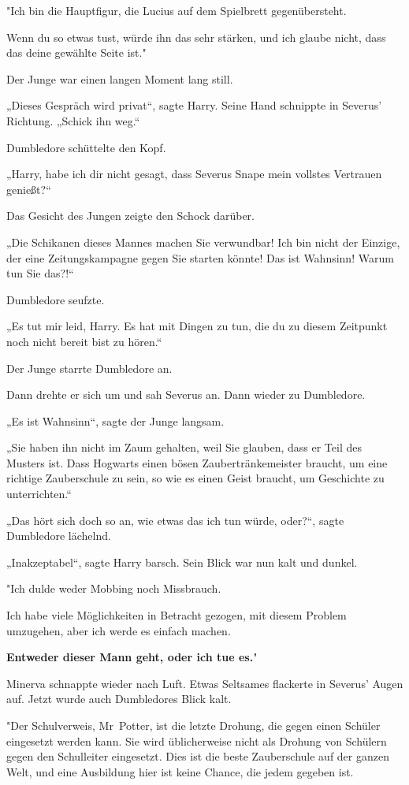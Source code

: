 {"Ich bin die Hauptfigur, die Lucius auf dem Spielbrett gegenübersteht.

Wenn du so etwas tust, würde ihn das sehr stärken, und ich glaube nicht, dass das deine gewählte Seite ist."

Der Junge war einen langen Moment lang still.

„Dieses Gespräch wird privat“, sagte Harry. Seine Hand schnippte in Severus' Richtung. „Schick ihn weg.“

Dumbledore schüttelte den Kopf.

„Harry, habe ich dir nicht gesagt, dass Severus Snape mein vollstes Vertrauen genießt?“

Das Gesicht des Jungen zeigte den Schock darüber.

„Die Schikanen dieses Mannes machen Sie verwundbar! Ich bin nicht der Einzige, der eine Zeitungskampagne gegen Sie starten könnte! Das ist Wahnsinn! Warum tun Sie das?!“

Dumbledore seufzte.

„Es tut mir leid, Harry. Es hat mit Dingen zu tun, die du zu diesem Zeitpunkt noch nicht bereit bist zu hören.“

Der Junge starrte Dumbledore an.

Dann drehte er sich um und sah Severus an. Dann wieder zu Dumbledore.

„Es ist Wahnsinn“, sagte der Junge langsam.

„Sie haben ihn nicht im Zaum gehalten, weil Sie glauben, dass er Teil des Musters ist. Dass Hogwarts einen bösen Zaubertränkemeister braucht, um eine richtige Zauberschule zu sein, so wie es einen Geist braucht, um Geschichte zu unterrichten.“

„Das hört sich doch so an, wie etwas das ich tun würde, oder?“, sagte Dumbledore lächelnd.

„Inakzeptabel“, sagte Harry barsch. Sein Blick war nun kalt und dunkel.

"Ich dulde weder Mobbing noch Missbrauch.

Ich habe viele Möglichkeiten in Betracht gezogen, mit diesem Problem umzugehen, aber ich werde es einfach machen.

\textbf{Entweder dieser Mann geht, oder ich tue es.}"

Minerva schnappte wieder nach Luft. Etwas Seltsames flackerte in Severus' Augen auf. Jetzt wurde auch Dumbledores Blick kalt.

"Der Schulverweis, Mr~Potter, ist die letzte Drohung, die gegen einen Schüler eingesetzt werden kann. Sie wird üblicherweise nicht als Drohung von Schülern gegen den Schulleiter eingesetzt. Dies ist die beste Zauberschule auf der ganzen Welt, und eine Ausbildung hier ist keine Chance, die jedem gegeben ist.

}
